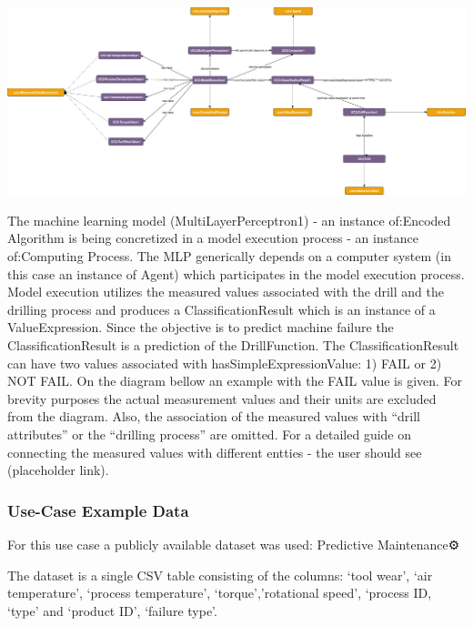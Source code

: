 \includegraphics[scale=0.23]{scenarios/algorithm-execution/images/algorithm-execution-usecase1.png}

The machine learning model (MultiLayerPerceptron1) - an instance of:Encoded Algorithm is being concretized in a model execution process - an instance of:Computing Process. The MLP generically depends on a computer system (in this case an instance of Agent) which participates in the model execution process. Model execution utilizes the measured values associated with the drill and the drilling process and produces a ClassificationResult which is an instance of a ValueExpression. Since the objective is to predict machine failure the ClassificationResult is a prediction of the DrillFunction. The ClassificationResult can have two values associated with hasSimpleExpressionValue: 1) FAIL or 2) NOT FAIL. On the diagram bellow an example with the FAIL value is given. For brevity purposes the actual measurement values and their units are excluded from the diagram. Also, the association of the measured values with “drill attributes” or the “drilling process” are omitted. For a detailed guide on connecting the measured values with different entties - the user should see (placeholder link).

\subsubsection*{Use-Case Example Data}

For this use case a publicly available dataset was used: Predictive Maintenance⚙️ 

The dataset is a single CSV table consisting of the columns: ‘tool wear’, ‘air temperature’, ‘process temperature’, ‘torque’,’rotational speed’, ‘process ID, ‘type’ and ‘product ID’, ‘failure type’.

